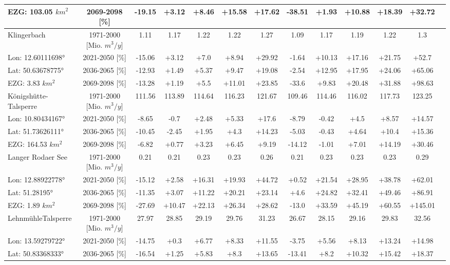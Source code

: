 \begin{longtable}{@{\extracolsep{\fill}}lc|ccccc||cccccc}
EZG: 103.05 $km^2$ & 2069-2098 [\%]  & -19.15 & +3.12 & +8.46 & +15.58 & +17.62 & -38.51 & +1.93 & +10.88 & +18.39 & +32.72 & \\ 
\hline 
Klingerbach & 1971-2000 [Mio. $m^3/y$]  & 1.11 & 1.17 & 1.22 & 1.22 & 1.27 & 1.09 & 1.17 & 1.19 & 1.22 & 1.3 & \\ 
\cline{2-13} 
Lon: 12.60111698° & 2021-2050 [\%]  & -15.06 & +3.12 & +7.0 & +8.94 & +29.92 & -1.64 & +10.13 & +17.16 & +21.75 & +52.7 & \\ 
Lat: 50.63678775° & 2036-2065 [\%]  & -12.93 & +1.49 & +5.37 & +9.47 & +19.08 & -2.54 & +12.95 & +17.95 & +24.06 & +65.06 & \\ 
EZG: 3.83 $km^2$ & 2069-2098 [\%]  & -13.28 & +1.19 & +5.5 & +11.01 & +23.85 & -33.6 & +9.83 & +20.48 & +31.88 & +98.63 & \\ 
\hline 
Königshütte-Talsperre & 1971-2000 [Mio. $m^3/y$]  & 111.56 & 113.89 & 114.64 & 116.23 & 121.67 & 109.46 & 114.46 & 116.02 & 117.73 & 123.25 & \\ 
\cline{2-13} 
Lon: 10.80434167° & 2021-2050 [\%]  & -8.65 & -0.7 & +2.48 & +5.33 & +17.6 & -8.79 & -0.42 & +4.5 & +8.57 & +14.57 & \\ 
Lat: 51.73626111° & 2036-2065 [\%]  & -10.45 & -2.45 & +1.95 & +4.3 & +14.23 & -5.03 & -0.43 & +4.64 & +10.4 & +15.36 & \\ 
EZG: 164.53 $km^2$ & 2069-2098 [\%]  & -6.82 & +0.77 & +3.23 & +6.45 & +9.19 & -14.12 & -1.01 & +7.01 & +14.19 & +30.46 & \\ 
\hline 
Langer Rodaer See & 1971-2000 [Mio. $m^3/y$]  & 0.21 & 0.21 & 0.23 & 0.23 & 0.26 & 0.21 & 0.23 & 0.23 & 0.23 & 0.29 & \\ 
\cline{2-13} 
Lon: 12.88922778° & 2021-2050 [\%]  & -15.12 & +2.58 & +16.31 & +19.93 & +44.72 & +0.52 & +21.54 & +28.95 & +38.78 & +62.01 & \\ 
Lat: 51.28195° & 2036-2065 [\%]  & -11.35 & +3.07 & +11.22 & +20.21 & +23.14 & +4.6 & +24.82 & +32.41 & +49.46 & +86.91 & \\ 
EZG: 1.89 $km^2$ & 2069-2098 [\%]  & -27.69 & +10.47 & +22.13 & +26.34 & +28.62 & -13.0 & +33.59 & +45.19 & +60.55 & +145.01 & \\ 
\hline 
LehnmühleTalsperre & 1971-2000 [Mio. $m^3/y$]  & 27.97 & 28.85 & 29.19 & 29.76 & 31.23 & 26.67 & 28.15 & 29.16 & 29.83 & 32.56 & \\ 
\cline{2-13} 
Lon: 13.59279722° & 2021-2050 [\%]  & -14.75 & +0.3 & +6.77 & +8.33 & +11.55 & -3.75 & +5.56 & +8.13 & +13.24 & +14.98 & \\ 
Lat: 50.83368333° & 2036-2065 [\%]  & -16.54 & +1.25 & +5.83 & +8.3 & +13.65 & -13.41 & +8.2 & +10.32 & +15.42 & +18.37 & \\ 

\end{longtable}

